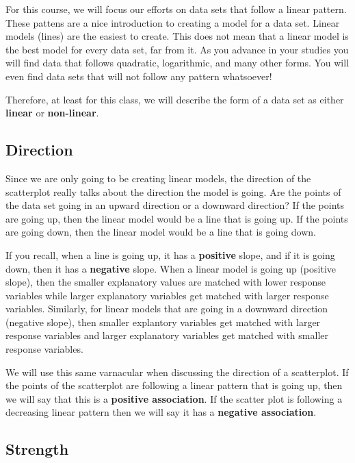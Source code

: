 \documentclass[
  letterpaper,
  DIV=11,
  numbers=noendperiod]{scrreprt}
\begin{document}
For this course, we will focus our efforts on data sets that follow a
linear pattern. These pattens are a nice introduction to creating a
model for a data set. Linear models (lines) are the easiest to create.
This does not mean that a linear model is the best model for every data
set, far from it. As you advance in your studies you will find data that
follows quadratic, logarithmic, and many other forms. You will even find
data sets that will not follow any pattern whatsoever!

Therefore, at least for this class, we will describe the form of a data
set as either \textbf{linear} or \textbf{non-linear}.

\subsection*{Direction}\label{direction}

Since we are only going to be creating linear models, the direction of
the scatterplot really talks about the direction the model is going. Are
the points of the data set going in an upward direction or a downward
direction? If the points are going up, then the linear model would be a
line that is going up. If the points are going down, then the linear
model would be a line that is going down.

If you recall, when a line is going up, it has a \textbf{positive}
slope, and if it is going down, then it has a \textbf{negative} slope.
When a linear model is going up (positive slope), then the smaller
explanatory values are matched with lower response variables while
larger explanatory variables get matched with larger response variables.
Similarly, for linear models that are going in a downward direction
(negative slope), then smaller explantory variables get matched with
larger response variables and larger explanatory variables get matched
with smaller response variables.

We will use this same varnacular when discussing the direction of a
scatterplot. If the points of the scatterplot are following a linear
pattern that is going up, then we will say that this is a
\textbf{positive association}. If the scatter plot is following a
decreasing linear pattern then we will say it has a \textbf{negative
association}.

\subsection*{Strength}\label{strength}
\end{document}
